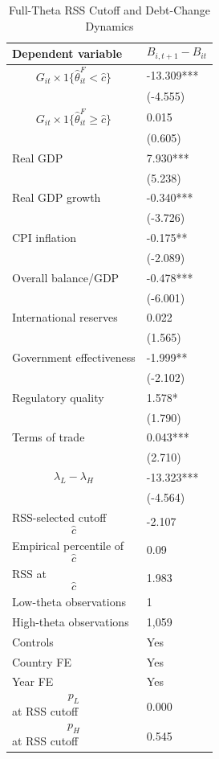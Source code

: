\begin{table}[H]\centering
\begin{threeparttable}
\caption{Full-Theta RSS Cutoff and Debt-Change Dynamics}
\label{tab:deltaB_rss_cutoff_fulltheta}
\scriptsize
\begin{tabularx}{\textwidth}{lY}
\toprule
Dependent variable & $$B_{i,t+1}-B_{it}$$ \\
\midrule
$$G_{it}\times 1\{\widehat{\theta}^{F}_{it}<\widehat{c}\}$$ & -13.309*** \\
 & (-4.555) \\
$$G_{it}\times 1\{\widehat{\theta}^{F}_{it}\geq\widehat{c}\}$$ & 0.015 \\
 & (0.605) \\
Real GDP & 7.930*** \\
 & (5.238) \\
Real GDP growth & -0.340*** \\
 & (-3.726) \\
CPI inflation & -0.175** \\
 & (-2.089) \\
Overall balance/GDP & -0.478*** \\
 & (-6.001) \\
International reserves & 0.022 \\
 & (1.565) \\
Government effectiveness & -1.999** \\
 & (-2.102) \\
Regulatory quality & 1.578* \\
 & (1.790) \\
Terms of trade & 0.043*** \\
 & (2.710) \\
$$\lambda_L-\lambda_H$$ & -13.323*** \\
 & (-4.564) \\
\midrule
RSS-selected cutoff $$\widehat{c}$$ & -2.107 \\
Empirical percentile of $$\widehat{c}$$ & 0.09 \\
RSS at $$\widehat{c}$$ & 1.983 \\
Low-theta observations & 1 \\
High-theta observations & 1,059 \\
Controls & Yes \\
Country FE & Yes \\
Year FE & Yes \\
$$p_L$$ at RSS cutoff & 0.000 \\
$$p_H$$ at RSS cutoff & 0.545 \\

\end{tabularx}
\end{threeparttable}
\end{table}
